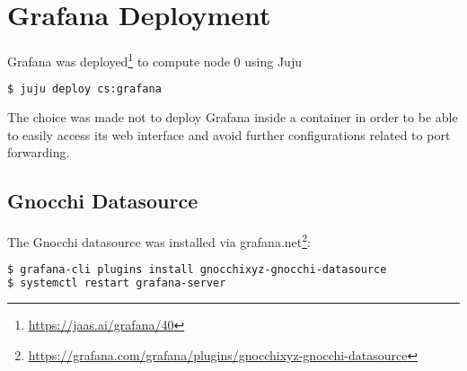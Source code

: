 \documentclass[11pt,a4paper]{article}
\begin{document}
\section{Grafana Deployment}
Grafana was deployed\footnote{\url{https://jaas.ai/grafana/40}} to compute node 0 using Juju
\begin{lstlisting}[language=bash]
$ juju deploy cs:grafana
\end{lstlisting}
The choice was made not to deploy Grafana inside a container in order to be able to easily access its web interface and avoid further configurations related to port forwarding.
\subsection{Gnocchi Datasource}
The Gnocchi datasource was installed via grafana.net\footnote{\url{https://grafana.com/grafana/plugins/gnocchixyz-gnocchi-datasource}}:
\begin{lstlisting}[language=bash]
$ grafana-cli plugins install gnocchixyz-gnocchi-datasource
$ systemctl restart grafana-server
\end{lstlisting}
\end{document}
